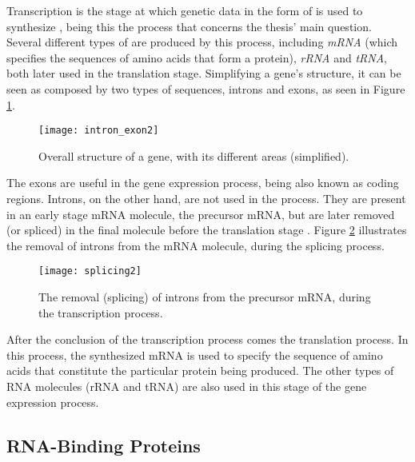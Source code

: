 Transcription is the stage at which genetic data in the form of \dna{} is used
to synthesize \rna{}, being this the process that concerns the thesis' main
question. Several different types of \rna{} are produced by this process,
including \emph{mRNA} (which specifies the sequences of amino acids that form a
protein), \emph{rRNA} and \emph{tRNA}, both later used in the translation stage. Simplifying
a gene's structure, it can be seen as composed by two types of sequences,
introns and exons, as seen in Figure \ref{fig:intron_exon}.

\begin{figure}[!htb]
  \begin{center}
    \leavevmode
    \texttt{[image: intron\_exon2]}
    \caption[Overall structure of a gene]{Overall structure of a gene, with its
    different areas (simplified).}
    \label{fig:intron_exon}
  \end{center}
\end{figure}

The exons are useful in the gene expression process, being also known as coding
regions. Introns, on the other hand, are not used in the process. They are
present in an early stage mRNA molecule, the precursor mRNA, but are later
removed (or spliced) in the final molecule before the translation stage
\cite{leic:gene_expr}. Figure \ref{fig:splicing} illustrates the removal of
introns from the mRNA molecule, during the  splicing process.

\begin{figure}[!htb]
  \begin{center}
    \leavevmode
    \texttt{[image: splicing2]}
    \caption[Removal of introns from precursor mRNA]{The removal (splicing) of
    introns from the precursor mRNA, during the transcription process.}
    \label{fig:splicing}
  \end{center}
\end{figure}

After the conclusion of the transcription process comes the translation process.
In this process, the synthesized mRNA is used to specify the sequence of amino
acids that constitute the particular protein being produced. The other types of
RNA molecules (rRNA and tRNA) are also used in this stage of the gene expression
process.

\subsection{RNA-Binding Proteins}

